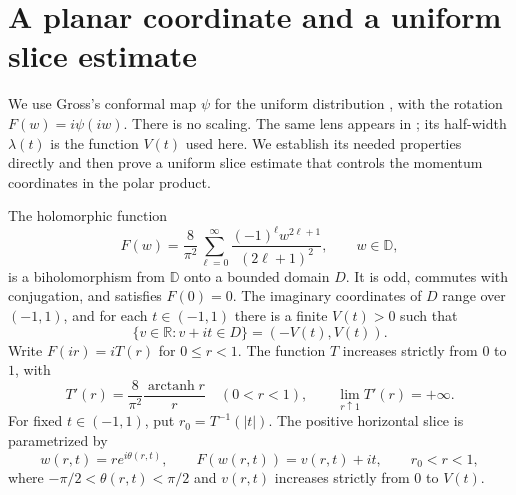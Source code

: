 \section{A planar coordinate and a uniform slice estimate}
\label{sec:planar}

We use Gross's conformal map $\psi$ for the uniform distribution \cite[Section~3.2]{Gross2019}, with the rotation $F(w)=i\psi(iw)$. There is no scaling. The same lens appears in \cite[Section~3]{SymmetricCompanion2026}; its half-width $\lambda(t)$ is the function $V(t)$ used here. We establish its needed properties directly and then prove a uniform slice estimate that controls the momentum coordinates in the polar product.

\begin{lemma}\label{lem:planar-map}
The holomorphic function
\begin{equation}\label{eq:planar-F}
 F(w)=\frac{8}{\pi^2}\sum_{\ell=0}^{\infty}
       \frac{(-1)^\ell w^{2\ell+1}}{(2\ell+1)^2},
 \qquad w\in\mathbb{D},
\end{equation}
is a biholomorphism from $\mathbb{D}$ onto a bounded domain $D$. It is odd, commutes with conjugation, and satisfies $F(0)=0$. The imaginary coordinates of $D$ range over $(-1,1)$, and for each $t\in(-1,1)$ there is a finite $V(t)>0$ such that
\begin{equation}\label{eq:horizontal-slices}
 \{v\in\mathbb{R}:v+it\in D\}=(-V(t),V(t)).
\end{equation}
Write $F(ir)=iT(r)$ for $0\le r<1$.  The function $T$ increases strictly from $0$ to $1$, with
\begin{equation}\label{eq:planar-T}
 T'(r)=\frac{8}{\pi^2}\frac{\operatorname{arctanh}r}{r}
 \quad(0<r<1),
 \qquad \lim_{r\uparrow1}T'(r)=+\infty.
\end{equation}
For fixed $t\in(-1,1)$, put $r_0=T^{-1}(|t|)$.  The positive horizontal slice is parametrized by
\[
 w(r,t)=re^{i\theta(r,t)},\qquad
 F(w(r,t))=v(r,t)+it,\qquad r_0<r<1,
\]
where $-\pi/2<\theta(r,t)<\pi/2$ and $v(r,t)$ increases strictly from $0$ to $V(t)$.
\end{lemma}

